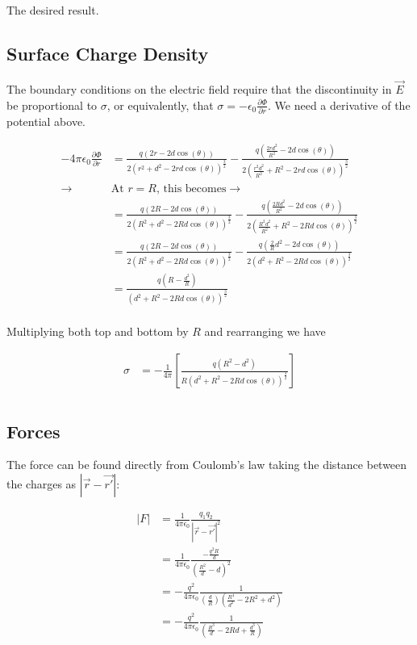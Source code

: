 \documentclass[paper=a4, fontsize=11pt]{scrartcl} %
\numberwithin{equation}{section} %
\numberwithin{figure}{section} %
\numberwithin{table}{section} %
\begin{document}
The desired result.

\subsection{Surface Charge Density}

The boundary conditions on the electric field require that the discontinuity in $\vec{E}$ be proportional to $\sigma$, or equivalently, that $\sigma = -\epsilon_0 \frac{\partial \Phi}{\partial r}$. We need a derivative of the potential above.

\begin{align}
-4 \pi \epsilon_0 \frac{\partial \Phi}{\partial r} &= \frac{q(2r - 2d\cos(\theta))}{2(r^2 + d^2 - 2 r d \cos(\theta))^{\frac{3}{2}}} - \frac{q\left(\frac{2rd^2}{R^2} - 2 d \cos(\theta)\right)}{2\left(\frac{r^2d^2}{R^2} + R^2 - 2 r d \cos(\theta)\right)^{\frac{3}{2}}} \\ 
\rightarrow & \text{At $r=R$, this becomes} \rightarrow \\
&= \frac{q(2R - 2d\cos(\theta))}{2(R^2 + d^2 - 2 R d \cos(\theta))^{\frac{3}{2}}} - \frac{q\left(\frac{2Rd^2}{R^2} - 2 d \cos(\theta)\right)}{2\left(\frac{R^2d^2}{R^2} + R^2 - 2 R d \cos(\theta)\right)^{\frac{3}{2}}} \\ 
&= \frac{q(2R - 2d\cos(\theta))}{2(R^2 + d^2 - 2 R d \cos(\theta))^{\frac{3}{2}}} - \frac{q\left(\frac{2}{R}d^2 - 2 d \cos(\theta)\right)}{2\left(d^2 + R^2 - 2 R d \cos(\theta)\right)^{\frac{3}{2}}} \\
&= \frac{q(R - \frac{d^2}{R})}{(d^2 + R^2 - 2 R d \cos(\theta))^{\frac{3}{2}}} \\
\end{align}

Multiplying both top and bottom by $R$ and rearranging we have

\begin{align}
\sigma &= -\frac{1}{4 \pi} \left[\frac{q(R^2 - d^2)}{R(d^2 + R^2 - 2 R d \cos(\theta))^{\frac{3}{2}}}\right] \\
\end{align}

\subsection{Forces}

The force can be found directly from Coulomb's law taking the distance between the charges as $|\vec{r} - \vec{r'}|$:

\begin{align}
|F| &= \frac{1}{4 \pi \epsilon_0}\frac{q_1 q_2}{|\vec{r}-\vec{r'}|^2} \\
&= \frac{1}{4 \pi \epsilon_0}\frac{-\frac{q^2 R}{d}}{(\frac{R^2}{d} - d)^2} \\
&= -\frac{q^2}{4 \pi \epsilon_0} \frac{1}{(\frac{d}{R})(\frac{R^4}{d^2} - 2R^2 + d^2)} \\
&= -\frac{q^2}{4 \pi \epsilon_0} \frac{1}{\left(\frac{R^3}{d} - 2 Rd + \frac{d^3}{R}\right)}
\end{align}
\end{document}
